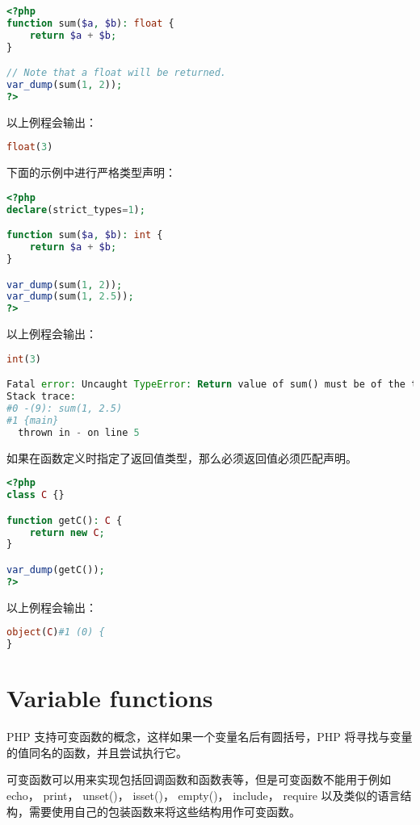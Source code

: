 \begin{lstlisting}[language=PHP]
<?php
function sum($a, $b): float {
    return $a + $b;
}

// Note that a float will be returned.
var_dump(sum(1, 2));
?>
\end{lstlisting}

以上例程会输出：

\begin{lstlisting}[language=PHP]
float(3)
\end{lstlisting}

下面的示例中进行严格类型声明：

\begin{lstlisting}[language=PHP]
<?php
declare(strict_types=1);

function sum($a, $b): int {
    return $a + $b;
}

var_dump(sum(1, 2));
var_dump(sum(1, 2.5));
?>
\end{lstlisting}

以上例程会输出：

\begin{lstlisting}[language=PHP]
int(3)

Fatal error: Uncaught TypeError: Return value of sum() must be of the type integer, float returned in - on line 5 in -:5
Stack trace:
#0 -(9): sum(1, 2.5)
#1 {main}
  thrown in - on line 5
\end{lstlisting}

如果在函数定义时指定了返回值类型，那么必须返回值必须匹配声明。


\begin{lstlisting}[language=PHP]
<?php
class C {}

function getC(): C {
    return new C;
}

var_dump(getC());
?>
\end{lstlisting}

以上例程会输出：

\begin{lstlisting}[language=PHP]
object(C)#1 (0) {
}
\end{lstlisting}

\chapter{Variable functions}


PHP 支持可变函数的概念，这样如果一个变量名后有圆括号，PHP 将寻找与变量的值同名的函数，并且尝试执行它。

可变函数可以用来实现包括回调函数和函数表等，但是可变函数不能用于例如 echo， print， unset()， isset()， empty()， include， require 以及类似的语言结构，需要使用自己的包装函数来将这些结构用作可变函数。

